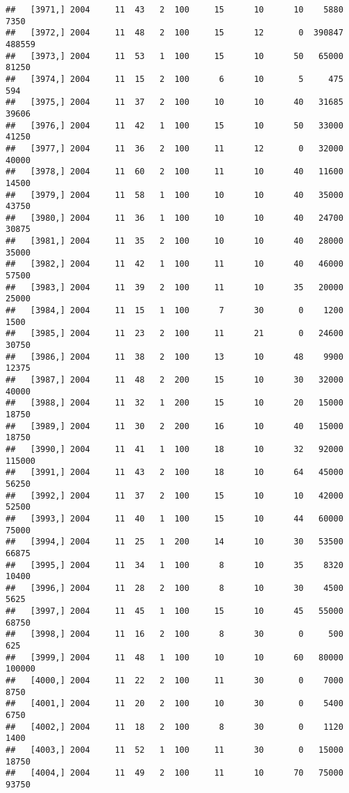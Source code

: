 \documentclass{article}\usepackage[]{graphicx}\usepackage[]{color}
\makeatletter
\newenvironment{kframe}{%
 \def\at@end@of@kframe{}%
 \ifinner\ifhmode%
  \def\at@end@of@kframe{\end{minipage}}%
  \begin{minipage}{\columnwidth}%
 \fi\fi%
 \def\FrameCommand##1{\hskip\@totalleftmargin \hskip-\fboxsep
 \colorbox{shadecolor}{##1}\hskip-\fboxsep
     \hskip-\linewidth \hskip-\@totalleftmargin \hskip\columnwidth}%
 \MakeFramed {\advance\hsize-\width
   \@totalleftmargin\z@ \linewidth\hsize
   \@setminipage}}%
 {\par\unskip\endMakeFramed%
 \at@end@of@kframe}
\newenvironment{knitrout}{}{} %
\makeatother
\begin{document}
\begin{knitrout}
\begin{kframe}
\begin{verbatim}
##   [3971,] 2004     11  43   2  100     15      10      10    5880    7350
##   [3972,] 2004     11  48   2  100     15      12       0  390847  488559
##   [3973,] 2004     11  53   1  100     15      10      50   65000   81250
##   [3974,] 2004     11  15   2  100      6      10       5     475     594
##   [3975,] 2004     11  37   2  100     10      10      40   31685   39606
##   [3976,] 2004     11  42   1  100     15      10      50   33000   41250
##   [3977,] 2004     11  36   2  100     11      12       0   32000   40000
##   [3978,] 2004     11  60   2  100     11      10      40   11600   14500
##   [3979,] 2004     11  58   1  100     10      10      40   35000   43750
##   [3980,] 2004     11  36   1  100     10      10      40   24700   30875
##   [3981,] 2004     11  35   2  100     10      10      40   28000   35000
##   [3982,] 2004     11  42   1  100     11      10      40   46000   57500
##   [3983,] 2004     11  39   2  100     11      10      35   20000   25000
##   [3984,] 2004     11  15   1  100      7      30       0    1200    1500
##   [3985,] 2004     11  23   2  100     11      21       0   24600   30750
##   [3986,] 2004     11  38   2  100     13      10      48    9900   12375
##   [3987,] 2004     11  48   2  200     15      10      30   32000   40000
##   [3988,] 2004     11  32   1  200     15      10      20   15000   18750
##   [3989,] 2004     11  30   2  200     16      10      40   15000   18750
##   [3990,] 2004     11  41   1  100     18      10      32   92000  115000
##   [3991,] 2004     11  43   2  100     18      10      64   45000   56250
##   [3992,] 2004     11  37   2  100     15      10      10   42000   52500
##   [3993,] 2004     11  40   1  100     15      10      44   60000   75000
##   [3994,] 2004     11  25   1  200     14      10      30   53500   66875
##   [3995,] 2004     11  34   1  100      8      10      35    8320   10400
##   [3996,] 2004     11  28   2  100      8      10      30    4500    5625
##   [3997,] 2004     11  45   1  100     15      10      45   55000   68750
##   [3998,] 2004     11  16   2  100      8      30       0     500     625
##   [3999,] 2004     11  48   1  100     10      10      60   80000  100000
##   [4000,] 2004     11  22   2  100     11      30       0    7000    8750
##   [4001,] 2004     11  20   2  100     10      30       0    5400    6750
##   [4002,] 2004     11  18   2  100      8      30       0    1120    1400
##   [4003,] 2004     11  52   1  100     11      30       0   15000   18750
##   [4004,] 2004     11  49   2  100     11      10      70   75000   93750

\end{verbatim}
\end{kframe}
\end{knitrout}
\end{document}
